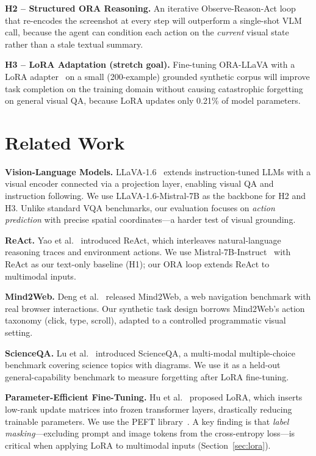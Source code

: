 \documentclass[10pt,twocolumn]{article}
\begin{document}
\textbf{H2 -- Structured ORA Reasoning.}
An iterative Observe-Reason-Act loop that re-encodes the screenshot at every step will
outperform a single-shot VLM call, because the agent can condition each action on the
\emph{current} visual state rather than a stale textual summary.

\textbf{H3 -- LoRA Adaptation (stretch goal).}
Fine-tuning ORA-LLaVA with a LoRA adapter~\cite{hu2022lora} on a small (200-example) grounded
synthetic corpus will improve task completion on the training domain without causing catastrophic
forgetting on general visual QA, because LoRA updates only 0.21\% of model parameters.

\section{Related Work}

\textbf{Vision-Language Models.}
LLaVA-1.6~\cite{liu2024llava} extends instruction-tuned LLMs with a visual encoder connected
via a projection layer, enabling visual QA and instruction following. We use LLaVA-1.6-Mistral-7B
as the backbone for H2 and H3. Unlike standard VQA benchmarks, our evaluation focuses on
\emph{action prediction} with precise spatial coordinates---a harder test of visual grounding.

\textbf{ReAct.}
Yao et al.~\cite{yao2023react} introduced ReAct, which interleaves natural-language reasoning
traces and environment actions. We use Mistral-7B-Instruct~\cite{jiang2023mistral} with ReAct
as our text-only baseline (H1); our ORA loop extends ReAct to multimodal inputs.

\textbf{Mind2Web.}
Deng et al.~\cite{deng2023mind2web} released Mind2Web, a web navigation benchmark with real
browser interactions. Our synthetic task design borrows Mind2Web's action taxonomy (click, type,
scroll), adapted to a controlled programmatic visual setting.

\textbf{ScienceQA.}
Lu et al.~\cite{lu2022scienceqa} introduced ScienceQA, a multi-modal multiple-choice benchmark
covering science topics with diagrams. We use it as a held-out general-capability benchmark to
measure forgetting after LoRA fine-tuning.

\textbf{Parameter-Efficient Fine-Tuning.}
Hu et al.~\cite{hu2022lora} proposed LoRA, which inserts low-rank update matrices into frozen
transformer layers, drastically reducing trainable parameters. We use the PEFT
library~\cite{mangrulkar2022peft}. A key finding is that \emph{label masking}---excluding prompt
and image tokens from the cross-entropy loss---is critical when applying LoRA to multimodal
inputs (Section~\ref{sec:lora}).
\end{document}
